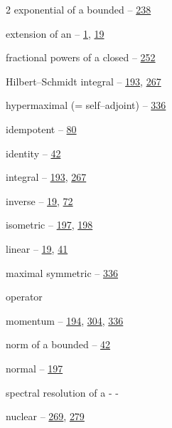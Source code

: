 \begin{multicols}{2}
\hspace*{1.1em}exponential of a bounded -- \hyperlink{page.238}{238}\par
\hspace*{1.1em}extension of an -- \hyperlink{page.1}{1}, \hyperlink{page.19}{19}\par
\hspace*{1.1em}fractional powers of a closed -- \hyperlink{page.252}{252}\par
\hspace*{1.1em}Hilbert--Schmidt integral -- \hyperlink{page.193}{193}, \hyperlink{page.267}{267}\par
\hspace*{1.1em}hypermaximal (= self--adjoint) -- \hyperlink{page.336}{336}\par
\hspace*{1.1em}idempotent -- \hyperlink{page.80}{80}\par
\hspace*{1.1em}identity -- \hyperlink{page.42}{42}\par
\hspace*{1.1em}integral -- \hyperlink{page.193}{193}, \hyperlink{page.267}{267}\par
\hspace*{1.1em}inverse -- \hyperlink{page.19}{19}, \hyperlink{page.72}{72}\par
\hspace*{1.1em}isometric -- \hyperlink{page.197}{197}, \hyperlink{page.198}{198}\par
\hspace*{1.1em}linear -- \hyperlink{page.19}{19}, \hyperlink{page.41}{41}\par
\hspace*{1.1em}maximal symmetric -- \hyperlink{page.336}{336}\par
\noindent operator\par
\hspace*{1.1em}momentum -- \hyperlink{page.194}{194}, \hyperlink{page.304}{304}, \hyperlink{page.336}{336}\par
\hspace*{1.1em}norm of a bounded -- \hyperlink{page.42}{42}\par
\hspace*{1.1em}normal -- \hyperlink{page.197}{197}\par
\hspace*{2.2em}spectral resolution of a - -\par
\hspace*{1.1em}nuclear -- \hyperlink{page.269}{269}, \hyperlink{page.279}{279}\par

\end{multicols}

